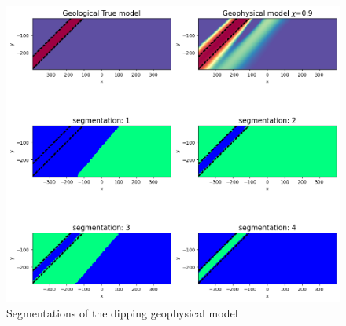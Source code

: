 \begin{figure}[htb]
    \vspace{-0.1cm}
    \begin{center}
    \includegraphics[width=\columnwidth]{figures/geosegments_dip.png}
    \end{center}
    \vspace{-0.5cm}
\caption{
    Segmentations of the dipping geophysical model
}
\label{fig:data-normalizations}
\vspace{-0.1cm}
\end{figure}